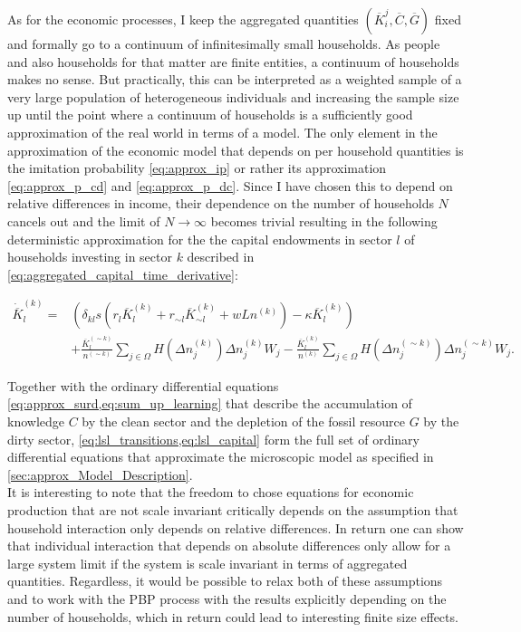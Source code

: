 As for the economic processes, I keep the aggregated quantities $(\overbar{K}_i^j, \overbar{C}, \overbar{G})$ fixed and formally go to a continuum of infinitesimally small households. As people and also households for that matter are finite entities, a continuum of households makes no sense. But practically, this can be interpreted as a weighted sample of a very large population of heterogeneous individuals and increasing the sample size up until the point where a continuum of households is a sufficiently good approximation of the real world in terms of a model. 
The only element in the approximation of the economic model that depends on per household quantities is the imitation probability \cref{eq:approx_ip} or rather its approximation \cref{eq:approx_p_cd} and \cref{eq:approx_p_dc}. Since I have chosen this to depend on relative differences in income, their dependence on the number of households $N$ cancels out and the limit of $N \rightarrow \infty$ becomes trivial resulting in the following deterministic approximation for the the capital endowments in sector $l$ of households investing in sector $k$ described in  \cref{eq:aggregated_capital_time_derivative}:

\begin{align}
  \dot{\overbar{K}}_l^{(k)} = &  \left(\delta_{kl} s\left( r_l \overbar{K}_l^{(k)} + r_{\sim l} \overbar{K}_{\sim l}^{(k)} + w  L n^{(k)} \right) - \kappa \overbar{K}_l^{(k)} \right) \nonumber \\
  &+ \frac{\overbar{K}_l^{(\sim k)}}{n^{(\sim k)}}\sum_{j \in \Omega}H\left( \Delta n_j^{(k)} \right) \Delta n_j^{(k)} W_j - \frac{\overbar{K}_l^{(k)}}{n^{(k)}}\sum_{j \in \Omega} H\left( \Delta n_j^{(\sim k)} \right) \Delta n_j^{(\sim k)}W_j.
  \label{eq:lsl_capital}
\end{align}

Together with the ordinary differential equations \cref{eq:approx_surd,eq:sum_up_learning} that describe the accumulation of knowledge $C$ by the clean sector and the depletion of the fossil resource $G$ by the dirty sector, \cref{eq:lsl_transitions,eq:lsl_capital} form the full set of ordinary differential equations that approximate the microscopic model as specified in \cref{sec:approx_Model_Description}.\\

It is interesting to note that the freedom to chose equations for economic production that are not scale invariant critically depends on the assumption that household interaction only depends on relative differences. In return one can show that individual interaction that depends on absolute differences only allow for a large system limit if the system is scale invariant in terms of aggregated quantities. Regardless, it would be possible to relax both of these assumptions and to work with the PBP process with the results explicitly depending on the number of households, which in return could lead to interesting finite size effects.


